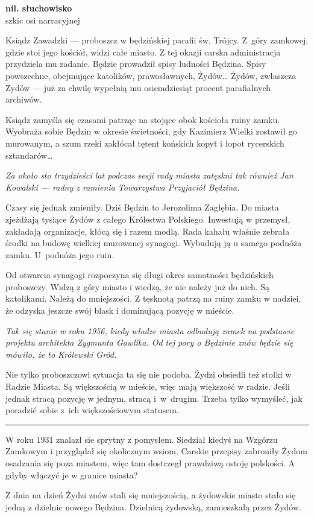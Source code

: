 \documentclass[11pt,a4paper,oneside]{article}
\begin{document}
\noindent
\textbf{nil. słuchowisko}\\
szkic osi narracyjnej

\noindent
Ksiądz Zawadzki --- proboszcz w będzińskiej parafii św. Trójcy.
Z~góry zamkowej, gdzie stoi jego kościół, widzi całe miasto.  Z tej
okazji carska administracja przydziela mu zadanie. Będzie prowadził
spisy ludności Będzina.  Spisy powszechne, obejmujące katolików,
prawosławnych, Żydów\dots{} Żydów, zwłaszcza Żydów --- już za chwilę
wypełnią mu osiemdziesiąt procent parafialnych archiwów. 

Ksiądz zamyśla się czasami patrząc na stojące obok kościoła ruiny
zamku.  Wyobraża sobie Będzin w okresie świetności, gdy Kazimierz
Wielki zostawił go murowanym, a szum rzeki zakłócał tętent końskich
kopyt i łopot rycerskich sztandarów\dots{}

\footnotesize{\emph{Za  około sto trzydzieści lat podczas sesji rady
miasta zatęskni tak również Jan Kowalski --- radny z ramienia
Towarzystwa Przyjaciół Będzina.}}

\normalsize
Czasy się jednak zmieniły. Dziś Będzin to Jerozolima Zagłębia. Do miasta
zjeżdżają tysiące Żydów z całego Królestwa Polskiego. Inwestują
w przemysł, zakładają organizacje, kłócą się i razem modlą. Rada
kahału właśnie zebrała środki na budowę wielkiej murowanej synagogi.
Wybudują ją u samego podnóża zamku. U~podnóża jego ruin.

Od otwarcia synagogi rozpoczyna się długi okres samotności będzińskich
proboszczy. Widzą z góry miasto i wiedzą, że nie należy już do nich.
Są katolikami. Należą do mniejszości. Z tęsknotą patrzą na ruiny zamku w nadziei,
że odzyska jeszcze swój blask i dominującą pozycję w mieście. 

\footnotesize{\emph{Tak się stanie w roku 1956, kiedy władze miasta
odbudują zamek na podstawie projektu architekta Zygmunta Gawlika. Od
tej pory o Będzinie znów będzie się mówiło, że to Królewski Gród.}}

\normalsize
Nie tylko proboszczowi sytuacja ta się nie podoba. Żydzi obsiedli też
stołki w Radzie Miasta. Są większością w mieście, więc mają większość
w radzie. Jeśli jednak stracą pozycję w jednym, stracą i~w~drugim. Trzeba
tylko wymyśleć, jak poradzić sobie z~ich większościowym statusem. 

\hrule

W roku 1931 znalazł sie sprytny z pomysłem. Siedział kiedyś na Wzgórzu
Zamkowym i przyglądał się okolicznym wsiom. Carskie przepisy zabroniły
Żydom osadzania się poza miastem, więc tam dostrzegł prawdziwą ostoję
polskości. A gdyby włączyć je w granice miasta? 

 Z dnia na dzień Żydzi znów stali się mniejszością,
a żydowskie miasto stało się jedną z dzielnic nowego Będzina.
Dzielnicą żydowską, zamieszkałą przez Żydów.
\end{document}

